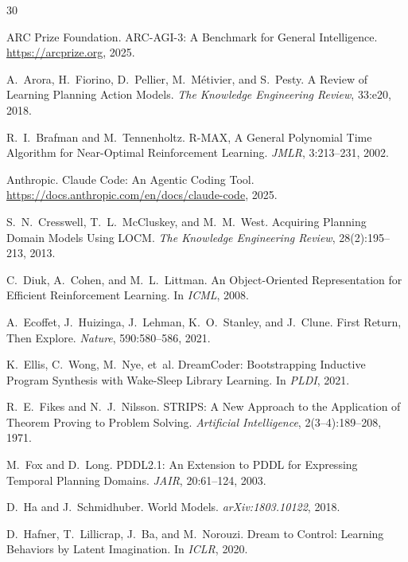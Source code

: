 \documentclass{article}
\begin{document}
\begin{thebibliography}{30}

{ARC Prize Foundation}.
\newblock ARC-AGI-3: A Benchmark for General Intelligence.
\newblock \url{https://arcprize.org}, 2025.

A.~Arora, H.~Fiorino, D.~Pellier, M.~M{\'e}tivier, and S.~Pesty.
\newblock A Review of Learning Planning Action Models.
\newblock \emph{The Knowledge Engineering Review}, 33:e20, 2018.

R.~I.~Brafman and M.~Tennenholtz.
\newblock R-MAX, A General Polynomial Time Algorithm for Near-Optimal
  Reinforcement Learning.
\newblock \emph{JMLR}, 3:213--231, 2002.

{Anthropic}.
\newblock Claude Code: An Agentic Coding Tool.
\newblock \url{https://docs.anthropic.com/en/docs/claude-code}, 2025.

S.~N.~Cresswell, T.~L.~McCluskey, and M.~M.~West.
\newblock Acquiring Planning Domain Models Using LOCM.
\newblock \emph{The Knowledge Engineering Review}, 28(2):195--213, 2013.

C.~Diuk, A.~Cohen, and M.~L.~Littman.
\newblock An Object-Oriented Representation for Efficient Reinforcement Learning.
\newblock In \emph{ICML}, 2008.

A.~Ecoffet, J.~Huizinga, J.~Lehman, K.~O.~Stanley, and J.~Clune.
\newblock First Return, Then Explore.
\newblock \emph{Nature}, 590:580--586, 2021.

K.~Ellis, C.~Wong, M.~Nye, et~al.
\newblock DreamCoder: Bootstrapping Inductive Program Synthesis with Wake-Sleep
  Library Learning.
\newblock In \emph{PLDI}, 2021.

R.~E.~Fikes and N.~J.~Nilsson.
\newblock STRIPS: A New Approach to the Application of Theorem Proving to
  Problem Solving.
\newblock \emph{Artificial Intelligence}, 2(3--4):189--208, 1971.

M.~Fox and D.~Long.
\newblock PDDL2.1: An Extension to PDDL for Expressing Temporal Planning
  Domains.
\newblock \emph{JAIR}, 20:61--124, 2003.

D.~Ha and J.~Schmidhuber.
\newblock World Models.
\newblock \emph{arXiv:1803.10122}, 2018.

D.~Hafner, T.~Lillicrap, J.~Ba, and M.~Norouzi.
\newblock Dream to Control: Learning Behaviors by Latent Imagination.
\newblock In \emph{ICLR}, 2020.


\end{thebibliography}
\end{document}
